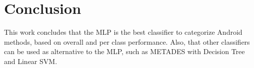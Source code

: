 \chapter{Conclusion}

This work concludes that the MLP is the best classifier to categorize Android methods, based on overall and per class performance. Also, that other classifiers can be used as alternative to the MLP, such as METADES with Decision Tree and Linear SVM. 
